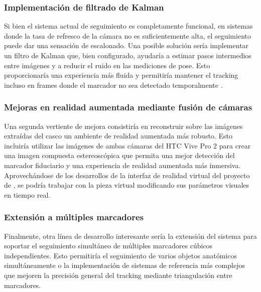 \subsubsection{Implementación de filtrado de Kalman}
Si bien el sistema actual de seguimiento es completamente funcional, en sistemas donde la tasa de refresco de la cámara no es suficientemente alta, el seguimiento puede dar una sensación de escalonado. Una posible solución sería implementar un filtro de Kalman que, bien configurado, ayudaría a estimar pasos intermedios entre imágenes y a reducir el ruido en las mediciones de pose. Esto proporcionaría una experiencia más fluida y permitiría mantener el tracking incluso en frames donde el marcador no sea detectado temporalmente \cite{welch2020kalman}.

\subsubsection{Mejoras en realidad aumentada mediante fusión de cámaras}
Una segunda vertiente de mejora consistiría en reconstruir sobre las imágenes extraídas del casco un ambiente de realidad aumentada más robusto. Esto incluiría utilizar las imágenes de ambas cámaras del HTC Vive Pro 2 para crear una imagen compuesta estereoscópica que permita una mejor detección del marcador fiduciario y una experiencia de realidad aumentada más inmersiva. Aprovechándose de los desarrollos de la interfaz de realidad virtual del proyecto de \citeauthor{IglesiasGuitian2022}, se podría trabajar con la pieza virtual modificando sus parámetros visuales en tiempo real.

\subsubsection{Extensión a múltiples marcadores}
Finalmente, otra línea de desarrollo interesante sería la extensión del sistema para soportar el seguimiento simultáneo de múltiples marcadores cúbicos independientes. Esto permitiría el seguimiento de varios objetos anatómicos simultáneamente o la implementación de sistemas de referencia más complejos que mejoren la precisión general del tracking mediante triangulación entre marcadores.